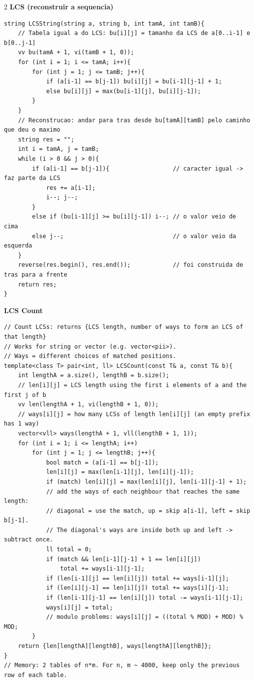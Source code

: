 \documentclass{article}
\begin{document}
\begin{multicols}{2}
\large
\Large\textbf{LCS (reconstruir a sequencia)}
\large
\begin{lstlisting}
string LCSString(string a, string b, int tamA, int tamB){
	// Tabela igual a do LCS: bu[i][j] = tamanho da LCS de a[0..i-1] e b[0..j-1]
	vv bu(tamA + 1, vi(tamB + 1, 0));
	for (int i = 1; i <= tamA; i++){
		for (int j = 1; j <= tamB; j++){
			if (a[i-1] == b[j-1]) bu[i][j] = bu[i-1][j-1] + 1;
			else bu[i][j] = max(bu[i-1][j], bu[i][j-1]);
		}
	}
	// Reconstrucao: andar para tras desde bu[tamA][tamB] pelo caminho que deu o maximo
	string res = "";
	int i = tamA, j = tamB;
	while (i > 0 && j > 0){
		if (a[i-1] == b[j-1]){                  // caracter igual -> faz parte da LCS
			res += a[i-1];
			i--; j--;
		}
		else if (bu[i-1][j] >= bu[i][j-1]) i--; // o valor veio de cima
		else j--;                               // o valor veio da esquerda
	}
	reverse(res.begin(), res.end());            // foi construida de tras para a frente
	return res;
}
\end{lstlisting}

\large
\Large\textbf{LCS Count}
\large
\begin{lstlisting}
// Count LCSs: returns {LCS length, number of ways to form an LCS of that length}
// Works for string or vector (e.g. vector<pii>).
// Ways = different choices of matched positions.
template<class T> pair<int, ll> LCSCount(const T& a, const T& b){
	int lengthA = a.size(), lengthB = b.size();
	// len[i][j] = LCS length using the first i elements of a and the first j of b
	vv len(lengthA + 1, vi(lengthB + 1, 0));
	// ways[i][j] = how many LCSs of length len[i][j] (an empty prefix has 1 way)
	vector<vll> ways(lengthA + 1, vll(lengthB + 1, 1));
	for (int i = 1; i <= lengthA; i++)
		for (int j = 1; j <= lengthB; j++){
			bool match = (a[i-1] == b[j-1]);
			len[i][j] = max(len[i-1][j], len[i][j-1]);
			if (match) len[i][j] = max(len[i][j], len[i-1][j-1] + 1);
			// add the ways of each neighbour that reaches the same length:
			// diagonal = use the match, up = skip a[i-1], left = skip b[j-1].
			// The diagonal's ways are inside both up and left -> subtract once.
			ll total = 0;
			if (match && len[i-1][j-1] + 1 == len[i][j])
				total += ways[i-1][j-1];
			if (len[i-1][j] == len[i][j]) total += ways[i-1][j];
			if (len[i][j-1] == len[i][j]) total += ways[i][j-1];
			if (len[i-1][j-1] == len[i][j]) total -= ways[i-1][j-1];
			ways[i][j] = total;
			// modulo problems: ways[i][j] = ((total % MOD) + MOD) % MOD;
		}
	return {len[lengthA][lengthB], ways[lengthA][lengthB]};
}
// Memory: 2 tables of n*m. For n, m ~ 4000, keep only the previous row of each table.
\end{lstlisting}


\end{multicols}
\end{document}
